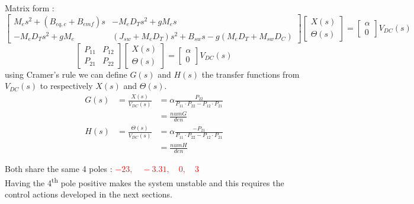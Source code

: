 \documentclass[11pt,a4paper]{article}
\begin{document}
Matrix form :
\begin{equation}
	\begin{bmatrix}
		M_e s^2 + (B_{eq,c} + B_{emf})s & -M_e D_T s^2 + g M_e s                                  \\
		-M_e D_T s^2 + g M_e            & (J_{sw} + M_e D_T)s^2 + B_{sw}s - g(M_eD_T + M_{sw}D_C)
	\end{bmatrix}
	\begin{bmatrix}
		X(s) \\
		\Theta(s)
	\end{bmatrix}
	=
	\begin{bmatrix}
		\alpha \\
		0
	\end{bmatrix}
	V_{DC}(s)
\end{equation}
\begin{equation}
	\begin{bmatrix}
		P_{11} & P_{12} \\
		P_{21} & P_{22}
	\end{bmatrix}
	\begin{bmatrix}
		X(s) \\
		\Theta(s)
	\end{bmatrix}
	=
	\begin{bmatrix}
		\alpha \\
		0
	\end{bmatrix}
	V_{DC}(s)
\end{equation}
using Cramer's rule we can define $G(s)$ and $H(s)$ the transfer functions from $V_{DC}(s)$ to respectively $X(s)$ and $\Theta(s)$.
\begin{equation}
	\begin{aligned}
		G(s) & = \frac{X(s)}{V_{DC}(s)}      & = \alpha \frac{P_{22}}{P_{11}\cdot P_{22} - P_{12} \cdot P_{21}}  \\
		     &                               & = \frac{numG}{den}                                                \\
		H(s) & = \frac{\Theta(s)}{V_{DC}(s)} & = \alpha \frac{-P_{21}}{P_{11}\cdot P_{22} - P_{12} \cdot P_{21}} \\
		     &                               & = \frac{numH}{den}
	\end{aligned}
\end{equation}

Both share the same 4 poles : \textcolor{red}{$-23, \quad -3.31, \quad 0, \quad 3$}\\
Having the 4\textsuperscript{th} pole positive makes the system unstable and this requires the control actions developed in the next sections.
\end{document}
